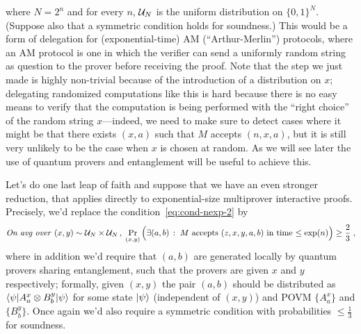 where $N=2^n$ and for every $n$, $\mathcal{U}_N$ is the uniform distribution on $\{0,1\}^N$. (Suppose also that a symmetric condition holds for soundness.) This would be a form of delegation for (exponential-time) AM (``Arthur-Merlin'') protocols, where an AM protocol is one in which the verifier can send a uniformly random string as question to the prover before receiving the proof.  Note that the step we just made is highly non-trivial because of the introduction of a distribution on $x$; delegating randomized computations like this is hard because there is no easy means to verify that the computation is being performed with the ``right choice'' of the random string $x$---indeed, we need to make sure to detect cases where it might be that there exists $(x,a)$ such that $M$ accepts $(n,x,a)$, but it is still very unlikely to be the case when $x$ is chosen at random. As we will see later the use of quantum provers and entanglement will be useful to achieve this. 

Let's do one last leap of faith and suppose that we have an even stronger reduction, that applies directly to exponential-size multiprover interactive proofs. Precisely, we'd replace the condition~\eqref{eq:cond-nexp-2} by
\begin{equation}\label{eq:cond-nexp-3}
\text{\emph{On avg over} } (x,y)\sim \mathcal{U}_N\times \mathcal{U}_N\,,\;  \Pr_{(x,y)}\Big(\exists (a,b) \,: \; M \text{ accepts $(z,x,y,a,b)$ in time $\leq \exp(n)$}\Big)\geq \frac{2}{3}\;,
\end{equation}
where in addition we'd require that $(a,b)$ are generated locally by quantum provers sharing entanglement, such that the provers are given $x$ and $y$ respectively; formally, given $(x,y)$ the pair $(a,b)$ should be distributed as $\langle\psi| A^x_a \otimes B^y_b |\psi\rangle$ for some state $|\psi\rangle$ (independent of $(x,y)$) and POVM $\{A^x_a\}$ and $\{B^y_b\}$. Once again we'd also require a symmetric condition with probabilities $\leq \frac{1}{3}$ for soundness. 

